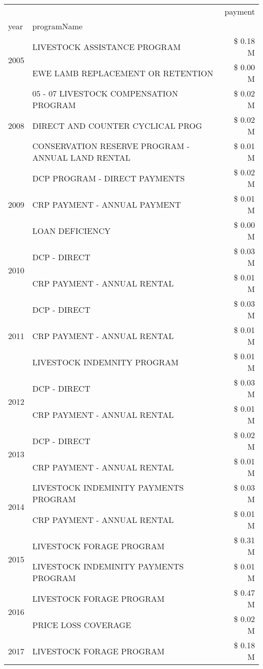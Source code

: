 \begin{tabular}{llr}
\toprule
 &  & payment \\
year & programName &  \\
\midrule
\multirow[t]{2}{*}{2005} & LIVESTOCK ASSISTANCE PROGRAM & \$ 0.18 M \\
 & EWE LAMB REPLACEMENT OR RETENTION & \$ 0.00 M \\
\cline{1-3}
\multirow[t]{3}{*}{2008} & 05 - 07 LIVESTOCK COMPENSATION PROGRAM & \$ 0.02 M \\
 & DIRECT AND COUNTER CYCLICAL PROG & \$ 0.02 M \\
 & CONSERVATION RESERVE PROGRAM - ANNUAL LAND RENTAL & \$ 0.01 M \\
\cline{1-3}
\multirow[t]{3}{*}{2009} & DCP PROGRAM - DIRECT PAYMENTS & \$ 0.02 M \\
 & CRP PAYMENT - ANNUAL PAYMENT & \$ 0.01 M \\
 & LOAN DEFICIENCY & \$ 0.00 M \\
\cline{1-3}
\multirow[t]{2}{*}{2010} & DCP - DIRECT & \$ 0.03 M \\
 & CRP PAYMENT - ANNUAL RENTAL & \$ 0.01 M \\
\cline{1-3}
\multirow[t]{3}{*}{2011} & DCP - DIRECT & \$ 0.03 M \\
 & CRP PAYMENT - ANNUAL RENTAL & \$ 0.01 M \\
 & LIVESTOCK INDEMNITY PROGRAM & \$ 0.01 M \\
\cline{1-3}
\multirow[t]{2}{*}{2012} & DCP - DIRECT & \$ 0.03 M \\
 & CRP PAYMENT - ANNUAL RENTAL & \$ 0.01 M \\
\cline{1-3}
\multirow[t]{2}{*}{2013} & DCP - DIRECT & \$ 0.02 M \\
 & CRP PAYMENT - ANNUAL RENTAL & \$ 0.01 M \\
\cline{1-3}
\multirow[t]{2}{*}{2014} & LIVESTOCK INDEMINITY PAYMENTS PROGRAM & \$ 0.03 M \\
 & CRP PAYMENT - ANNUAL RENTAL & \$ 0.01 M \\
\cline{1-3}
\multirow[t]{2}{*}{2015} & LIVESTOCK FORAGE PROGRAM & \$ 0.31 M \\
 & LIVESTOCK INDEMINITY PAYMENTS PROGRAM & \$ 0.01 M \\
\cline{1-3}
\multirow[t]{2}{*}{2016} & LIVESTOCK FORAGE PROGRAM & \$ 0.47 M \\
 & PRICE LOSS COVERAGE & \$ 0.02 M \\
\cline{1-3}
\multirow[t]{2}{*}{2017} & LIVESTOCK FORAGE PROGRAM & \$ 0.18 M \\

\end{tabular}
